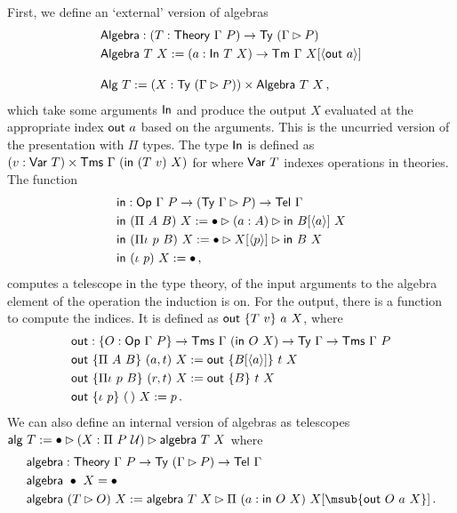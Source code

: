 First, we define an `external' version of algebras
\begin{align*}
    &\mta{Algebra} : (T : \mta{Theory}\ \Gamma\ P) \to \Ty\ (\Gamma \rhd P) \\
    &\mta{Algebra}\ T\ X := (a : \mta{In}\ T\ X) \to \Tm\ \Gamma\ X[\Msub{\mta{out}\ a}] \\[1em]
    &\mta{Alg}\ T := (X : \Ty\ (\Gamma \rhd P)) \times \mta{Algebra}\ T\ X \,,
\end{align*}
which take some arguments $\textsf{In}$ and produce the output $X$
evaluated at the appropriate index $\mta{out}\ a$ based on the arguments.
This is the uncurried version of the presentation with $\Pi$ types.
The type $\textsf{In}$ is defined as $(v : \textsf{Var}\ T) \times \textsf{Tms}\ \Gamma\
(\textsf{in}\ (T\ v)\ X)$ for where $\textsf{Var}\ T$ indexes
operations in theories. The function
\begin{align*}
    &\mta{in} : \mta{Op}\ \Gamma\ P \to (\Ty\ \Gamma \rhd P) \to \Tel\ \Gamma \\
    &\mta{in}\ (\Pi\ A\ B)\ X := \bullet \rhd (a : A) \rhd \mta{in}\ B[\Msub a]\ X \\
    &\mta{in}\ (\Pi\iota\ p\ B)\ X := \bullet \rhd X[\Msub p] \rhd \mta{in}\ B\ X \\
    &\mta{in}\ (\iota\ p)\ X := \bullet \,,
\end{align*}
computes a telescope in the type theory, of the input arguments to the algebra
element of the operation the induction is on. For the output, there is a function to compute
the indices. It is defined as $\textsf{out}\ \{T\ v\}\ a\ X$, where
\begin{align*}
    &\mta{out} : \{O : \Op\ \Gamma\ P\} \to \Tms\ \Gamma\ (\mta{in}\ O\ X) \to \Ty\ \Gamma \to \Tms\ \Gamma\ P \\
    &\mta{out}\ \{\Pi\ A\ B\}\ (a, t)\ X := \mta{out}\ \{B[\Msub a]\}\ t\ X \\
    &\mta{out}\ \{\Pi\iota\ p\ B\}\ (r, t)\ X := \mta{out}\ \{B\}\ t\ X \\
    &\mta{out}\ \{\iota\ p\}\ (\,)\ X := p \,.
\end{align*}
We can also define an internal version of algebras as telescopes
$\textsf{alg}\ T := \bullet \rhd (X : \Pi\ P\ \mathcal{U}) \rhd \textsf{algebra}\ T\ X$ where
\begin{align*}
    &\mta{algebra} : \mta{Theory}\ \Gamma\ P \to \Ty\ (\Gamma \rhd P) \to \Tel\ \Gamma \\
    &\mta{algebra}\ \bullet\ X = \bullet \\
    &\mta{algebra}\ (T \rhd O)\ X := \mta{algebra}\ T\ X \rhd \Pi\ (a : \mta{in}\ O\ X)\ X[\msub{\mta{out}\ O\ a\ X}] \,.
\end{align*}

